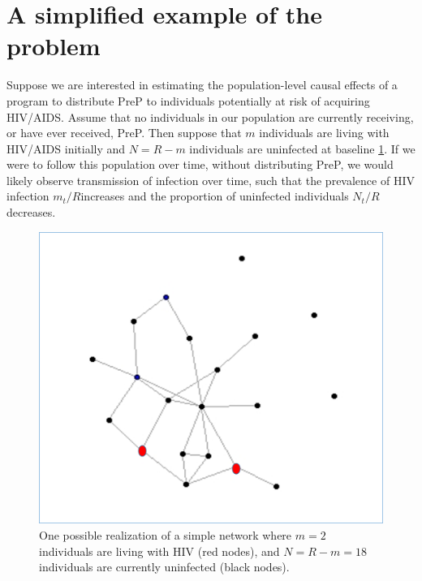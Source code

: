 \documentclass{article}
\theoremstyle{definition}
\begin{document}
\section{A simplified example of the problem}
Suppose we are interested in estimating the population-level causal effects of a program to distribute PreP to individuals potentially at risk of acquiring HIV/AIDS. Assume that no individuals in our population are currently receiving, or have ever received, PreP. Then suppose that $m$ individuals are living with HIV/AIDS initially and $N = R-m$ individuals are uninfected at baseline \ref{fig: Figure 2}. If we were to follow this population over time, without distributing PreP, we would likely observe transmission of infection over time, such that the prevalence of HIV infection $m_t/R$increases and the proportion of uninfected individuals $N_t/R$ decreases. 

\begin{figure}[H]
    \centering
    \includegraphics[scale=0.5]{Original Figures/Network Example 1.png}
    \caption{One possible realization of a simple network where $m = 2$ individuals are living with HIV (red nodes), and $N=R-m = 18$ individuals are currently uninfected (black nodes).}
    \label{fig: Figure 2}
\end{figure}
\end{document}

